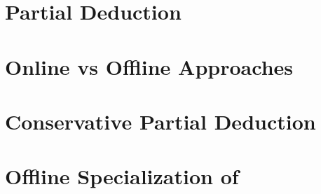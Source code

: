 \documentclass[float=true, crop=false]{standalone}
\begin{document}
\section{Partial Deduction}
\section{Online vs Offline Approaches}
\section{Conservative Partial Deduction}
\section{Offline Specialization of \mk}
\end{document}
